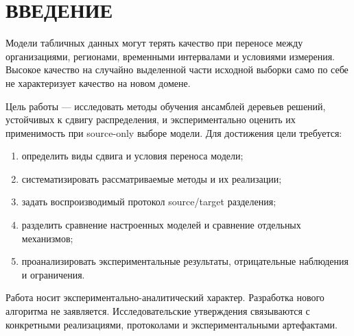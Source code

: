 \chapter*{ВВЕДЕНИЕ}

Модели табличных данных могут терять качество при переносе между организациями, регионами, временными интервалами и условиями измерения. Высокое качество на случайно выделенной части исходной выборки само по себе не характеризует качество на новом домене.

Цель работы --- исследовать методы обучения ансамблей деревьев решений, устойчивых к сдвигу распределения, и экспериментально оценить их применимость при source-only выборе модели. Для достижения цели требуется:
\begin{enumerate}
\item определить виды сдвига и условия переноса модели;
\item систематизировать рассматриваемые методы и их реализации;
\item задать воспроизводимый протокол source/target разделения;
\item разделить сравнение настроенных моделей и сравнение отдельных механизмов;
\item проанализировать экспериментальные результаты, отрицательные наблюдения и ограничения.
\end{enumerate}

Работа носит экспериментально-аналитический характер. Разработка нового алгоритма не заявляется. Исследовательские утверждения связываются с конкретными реализациями, протоколами и экспериментальными артефактами.
